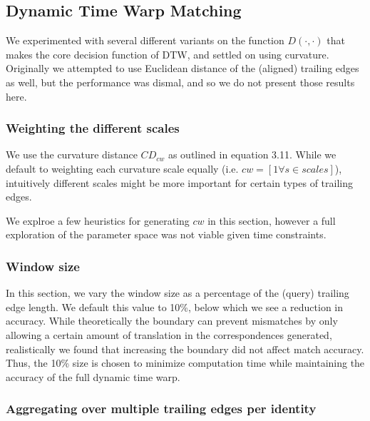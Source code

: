 \subsection{Dynamic Time Warp Matching}

We experimented with several different variants on the function $D(\cdot,\cdot)$ that makes the core decision function of DTW, and settled on using curvature.
Originally we attempted to use Euclidean distance of the (aligned) trailing edges as well, but the performance was dismal, and so we do not present those results here.

\subsubsection{Weighting the different scales}

We use the curvature distance $CD_{cw}$ as outlined in equation 3.11.
While we default to weighting each curvature scale equally (i.e. $cw = [1 \forall s \in scales]$), intuitively different scales might be more important for certain types of trailing edges.

We explroe a few heuristics for generating $cw$ in this section, however a full exploration of the parameter space was not viable given time constraints.


\subsubsection{Window size}

In this section, we vary the window size as a percentage of the (query) trailing edge length.
We default this value to 10\%, below which we see a reduction in accuracy.
While theoretically the boundary can prevent mismatches by only allowing a certain amount of translation in the correspondences generated, realistically we found that increasing the boundary did not affect match accuracy.
Thus, the 10\% size is chosen to minimize computation time while maintaining the accuracy of the full dynamic time warp.


\subsubsection{Aggregating over multiple trailing edges per identity}

